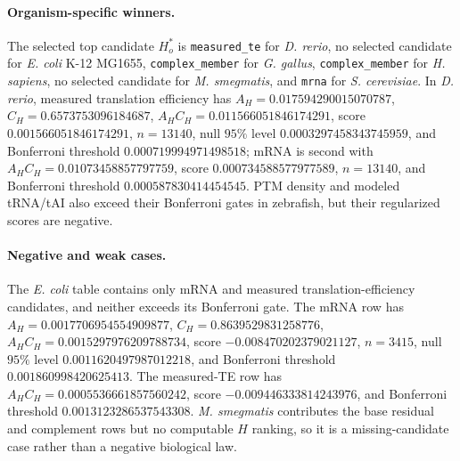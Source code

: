 \paragraph{Organism-specific winners.}
The selected top candidate $H^*_o$ is \texttt{measured\_te} for \emph{D. rerio}, no selected candidate for \emph{E. coli} K-12 MG1655, \texttt{complex\_member} for \emph{G. gallus}, \texttt{complex\_member} for \emph{H. sapiens}, no selected candidate for \emph{M. smegmatis}, and \texttt{mrna} for \emph{S. cerevisiae}.  In \emph{D. rerio}, measured translation efficiency has $A_H=0.017594290015070787$, $C_H=0.6573753096184687$, $A_HC_H=0.011566051846174291$, score $0.001566051846174291$, $n=13140$, null $95\%$ level $0.0003297458343745959$, and Bonferroni threshold $0.000719994971498518$; mRNA is second with $A_HC_H=0.01073458857797759$, score $0.000734588577977589$, $n=13140$, and Bonferroni threshold $0.000587830414454545$.  PTM density and modeled tRNA/tAI also exceed their Bonferroni gates in zebrafish, but their regularized scores are negative.

\paragraph{Negative and weak cases.}
The \emph{E. coli} table contains only mRNA and measured translation-efficiency candidates, and neither exceeds its Bonferroni gate.  The mRNA row has $A_H=0.0017706954554909877$, $C_H=0.8639529831258776$, $A_HC_H=0.0015297976209788734$, score $-0.008470202379021127$, $n=3415$, null $95\%$ level $0.0011620497987012218$, and Bonferroni threshold $0.001860998420625413$.  The measured-TE row has $A_HC_H=0.0005536661857560242$, score $-0.009446333814243976$, and Bonferroni threshold $0.0013123286537543308$.  \emph{M. smegmatis} contributes the base residual and complement rows but no computable $H$ ranking, so it is a missing-candidate case rather than a negative biological law.

